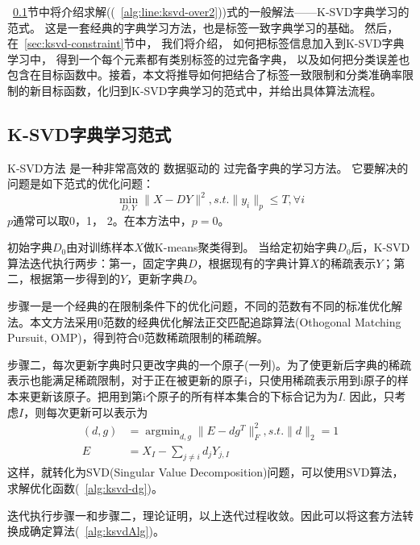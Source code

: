     ~\ref{sec:lsvd-lasso}节中将介绍求解((~\ref{alg:line:ksvd-over2}))式的一般解法——K-SVD字典学习的范式。 这是一套经典的字典学习方法，也是标签一致字典学习的基础。 然后， 在~\ref{sec:ksvd-constraint}节中，  我们将介绍， 如何把标签信息加入到K-SVD字典学习中，  得到一个每个元素都有类别标签的过完备字典\cite{jiang2013label}， 以及如何把分类误差也包含在目标函数中。接着，本文将推导如何把结合了标签一致限制和分类准确率限制的新目标函数，化归到K-SVD字典学习的范式中，并给出具体算法流程。


    \subsection{K-SVD字典学习范式} 
    \label{sec:lsvd-lasso}
    K-SVD方法 \cite{aharon2006rm}是一种非常高效的 数据驱动的 过完备字典的学习方法。  它要解决的问题是如下范式的优化问题：
    \begin{equation}
    \label{alg:ksvd-lasso}
        \min _{D, Y} \| X - DY \| ^2 , s.t. \| y_i \| _p \le T, \forall i
    \end{equation}
    $p$通常可以取0，1， 2。在本方法中，$p = 0$。

    初始字典$D_0$由对训练样本$X$做K-means\cite{kanungo2002efficient}聚类得到。
    当给定初始字典$D_0$后，K-SVD算法迭代执行两步：第一，固定字典$D$，根据现有的字典计算$X$的稀疏表示$Y$；第二，根据第一步得到的$Y$，更新字典$D$。

    步骤一是一个经典的在限制条件下的优化问题，不同的范数有不同的标准优化解法。本文方法采用0范数的经典优化解法正交匹配追踪算法(Othogonal Matching Pursuit, OMP)\cite{pati1993orthogonal}，得到符合0范数稀疏限制的稀疏解。

    步骤二，每次更新字典时只更改字典的一个原子(一列)。为了使更新后字典的稀疏表示也能满足稀疏限制，对于正在被更新的原子i，只使用稀疏表示用到i原子的样本来更新该原子。把用到第i个原子的所有样本集合的下标合记为为$I$. 因此，只考虑$I$，则每次更新可以表示为
    \begin{equation}
    \label{alg:ksvd-dg}
    \begin{split}
    (d, g) &= \mathop{\arg \min}_{d, g}\|E - d g^T\| ^2 _F, s.t.\|d\|_ 2 = 1 \\
    E &= X_I - \sum _{j\ne i} d_j Y_{j, I}
    \end{split}
    \end{equation}
    这样，就转化为SVD(Singular Value Decomposition)问题，可以使用SVD算法，求解优化函数(~\ref{alg:ksvd-dg})。

    迭代执行步骤一和步骤二，理论证明\cite{aharon2006rm}，以上迭代过程收敛。因此可以将这套方法转换成确定算法(~\ref{alg:ksvdAlg})。

